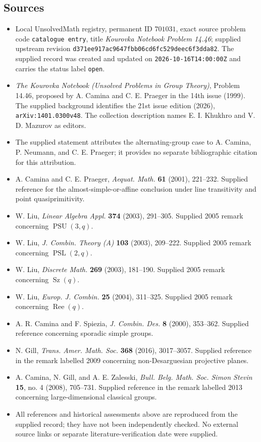 \documentclass[11pt]{article}
\begin{document}
\subsection{Sources}
\begin{itemize}
\item Local UnsolvedMath registry, permanent ID \(701031\), exact source problem code \texttt{catalogue entry}, title \emph{Kourovka Notebook Problem 14.46}; supplied upstream revision \texttt{d371ee917ac9647fbb06cd6fc529deec6f3dda82}. The supplied record was created and updated on \texttt{2026-10-16T14:00:00Z} and carries the status label \texttt{open}.
\item \emph{The Kourovka Notebook (Unsolved Problems in Group Theory)}, Problem 14.46, proposed by A. Camina and C. E. Praeger in the 14th issue (1999). The supplied background identifies the 21st issue edition (2026), \texttt{arXiv:1401.0300v48}. The collection description names E. I. Khukhro and V. D. Mazurov as editors.
\item The supplied statement attributes the alternating-group case to A. Camina, P. Neumann, and C. E. Praeger; it provides no separate bibliographic citation for this attribution.
\item A. Camina and C. E. Praeger, \emph{Aequat. Math.} \textbf{61} (2001), 221--232. Supplied reference for the almost-simple-or-affine conclusion under line transitivity and point quasiprimitivity.
\item W. Liu, \emph{Linear Algebra Appl.} \textbf{374} (2003), 291--305. Supplied 2005 remark concerning \(\operatorname{PSU}(3,q)\).
\item W. Liu, \emph{J. Combin. Theory (A)} \textbf{103} (2003), 209--222. Supplied 2005 remark concerning \(\operatorname{PSL}(2,q)\).
\item W. Liu, \emph{Discrete Math.} \textbf{269} (2003), 181--190. Supplied 2005 remark concerning \(\operatorname{Sz}(q)\).
\item W. Liu, \emph{Europ. J. Combin.} \textbf{25} (2004), 311--325. Supplied 2005 remark concerning \(\operatorname{Ree}(q)\).
\item A. R. Camina and F. Spiezia, \emph{J. Combin. Des.} \textbf{8} (2000), 353--362. Supplied reference concerning sporadic simple groups.
\item N. Gill, \emph{Trans. Amer. Math. Soc.} \textbf{368} (2016), 3017--3057. Supplied reference in the remark labelled 2009 concerning non-Desarguesian projective planes.
\item A. Camina, N. Gill, and A. E. Zalesski, \emph{Bull. Belg. Math. Soc. Simon Stevin} \textbf{15}, no. 4 (2008), 705--731. Supplied reference in the remark labelled 2013 concerning large-dimensional classical groups.
\item All references and historical assessments above are reproduced from the supplied record; they have not been independently checked. No external source links or separate literature-verification date were supplied.
\end{itemize}
\end{document}
